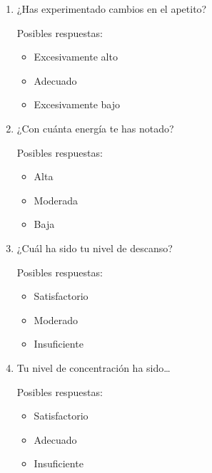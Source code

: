             \begin{enumerate}
                \item ¿Has experimentado cambios en el apetito?
                
                Posibles respuestas:
                    \begin{itemize}
                        \item Excesivamente alto  
                        \item Adecuado
                        \item Excesivamente bajo
                    \end{itemize}

                \item ¿Con cuánta energía te has notado?
                
                Posibles respuestas:
                    \begin{itemize}
                        \item Alta
                        \item Moderada
                        \item Baja
                    \end{itemize}

                \item ¿Cuál ha sido tu nivel de descanso?
                
                Posibles respuestas:
                    \begin{itemize}
                        \item Satisfactorio  
                        \item Moderado
                        \item Insuficiente
                    \end{itemize}
                    
                \item Tu nivel de concentración ha sido…
                
                Posibles respuestas:
                    \begin{itemize}
                        \item Satisfactorio  
                        \item Adecuado
                        \item Insuficiente
                    \end{itemize}
                    

\end{enumerate}
